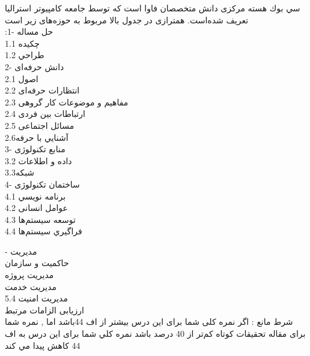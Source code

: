 \documentclass[a4 paper,12pt]{article}\usepackage{float, graphicx,xepersian }
\begin{document}
\noindent
سي بوك هسته مرکزی دانش متخصصان فاوا است که توسط جامعه کامپیوتر استرالیا تعریف شده‌است. همترازی در جدول بالا مربوط به حوزه‌های زیر است \\
:1- حل مساله\\
1.1 چكيده\\
1.2 طراحي\\
2- دانش حرفه‌ای\\
2.1 اصول\\
2.2 انتظارات حرفه‌ای\\
2.3 مفاهیم و موضوعات کار گروهی\\
2.4 ارتباطات بین فردی\\
2.5 مسائل اجتماعی\\
2.6آشنايي با حرفه 
\\
3- منابع تکنولوژی \\
3.2 داده و اطلاعات\\
3.3شبكه\\
4- ساختمان تکنولوژی\\
4.1 برنامه نويسي\\
4.2 عوامل انسانی\\
4.3 توسعه سیستم‌ها\\
4.4 فراگيري سیستم‌ها

- مديريت 
\\
 حاکمیت و سازمان  
\\
 مدیریت پروژه    
\\
 مدیریت خدمت\\
5.4 مدیریت امنیت\\

\noindent
ارزیابی الزامات مرتبط\\

\noindent
شرط مانع : اگر نمره کلی شما برای این درس بیشتر از اف 44باشد اما , نمره شما برای مقاله تحقیقات کوتاه کم‌تر از 40 درصد باشد نمره كلي شما برای این درس به اف 44 كاهش پيدا مي كند 
\end{document}
